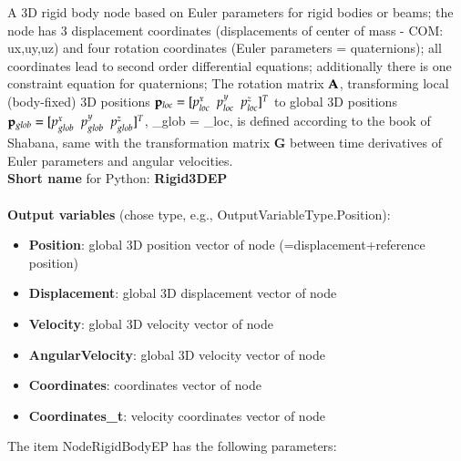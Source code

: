 A 3D rigid body node based on Euler parameters for rigid bodies or beams; the node has 3 displacement coordinates (displacements of center of mass - COM: ux,uy,uz) and four rotation coordinates (Euler parameters = quaternions); all coordinates lead to second order differential equations; additionally there is one constraint equation for quaternions; The rotation matrix $\mathbf{A}$, transforming local (body-fixed) 3D positions $\mathbf{p}_{loc} = [p^x_{loc}\;\;p^y_{loc}\;\;p^z_{loc}]^T$ to global 3D positions $\mathbf{p}_{glob} = [p^x_{glob}\;\;p^y_{glob}\;\;p^z_{glob}]^T$, \be \pv_{glob} = \Am \pv_{loc}, \ee is defined according to the book of Shabana, same with the transformation matrix $\mathbf{G}$ between time derivatives of Euler parameters and angular velocities.
 \\
{\bf Short name} for Python: {\bf Rigid3DEP}
 \\\\ 
{\bf Output variables} (chose type, e.g., OutputVariableType.Position): 
\begin{itemize}
    \item {\bf Position}: global 3D position vector of node (=displacement+reference position)
    \item {\bf Displacement}: global 3D displacement vector of node
    \item {\bf Velocity}: global 3D velocity vector of node
    \item {\bf AngularVelocity}: global 3D velocity vector of node
    \item {\bf Coordinates}: coordinates vector of node
    \item {\bf Coordinates\_t}: velocity coordinates vector of node
\end{itemize}
The item NodeRigidBodyEP has the following parameters:
